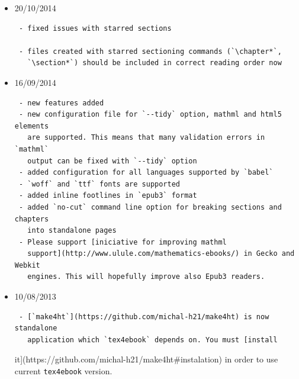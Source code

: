 \begin{itemize}
\begin{verbatim}
- added new command `\OpfGuide`, for adding items to `<guide>`
  section in the `opf` file. This is useful for `epub` and `mobi` formats.

  Usage:

       \OpfGuide[filename]{title}{reference type}

   `filename` is optional, current file name is used when empty. See
   [epub 
   secrets](http://epubsecrets.com/where-do-you-start-an-epub-and-what-is-the-guide-section-of-the-opf-file.php)
   article
\end{verbatim}
\item
  20/10/2014

\begin{verbatim}
 - fixed issues with starred sections

 - files created with starred sectioning commands (`\chapter*`,
   `\section*`) should be included in correct reading order now
\end{verbatim}
\item
  16/09/2014

\begin{verbatim}
 - new features added
 - new configuration file for `--tidy` option, mathml and html5 elements
   are supported. This means that many validation errors in `mathml`
   output can be fixed with `--tidy` option
 - added configuration for all languages supported by `babel`
 - `woff` and `ttf` fonts are supported
 - added inline footlines in `epub3` format
 - added `no-cut` command line option for breaking sections and chapters
   into standalone pages
 - Please support [iniciative for improving mathml
   support](http://www.ulule.com/mathematics-ebooks/) in Gecko and Webkit
   engines. This will hopefully improve also Epub3 readers.
\end{verbatim}
\item
  10/08/2013

\begin{verbatim}
 - [`make4ht`](https://github.com/michal-h21/make4ht) is now standalone
   application which `tex4ebook` depends on. You must [install
\end{verbatim}

  it{]}(https://github.com/michal-h21/make4ht\#instalation) in order to
  use current \texttt{tex4ebook} version.
\end{itemize}
